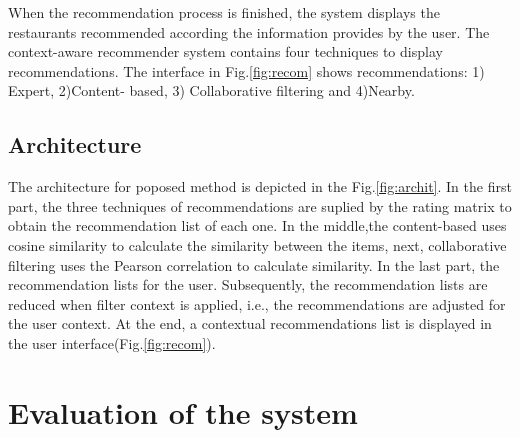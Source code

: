 \begin{figure*}
\captionsetup{justification=centering,margin=2cm}
\centering
{}
\caption{System interface to collect contextual information.}
\label{fig:context}     
\end{figure*}


When the recommendation process is finished, the system displays the restaurants
recommended according the information provides by the user. The context-aware
recommender system contains four techniques to display recommendations. The
interface in Fig.\ref{fig:recom} shows recommendations: 1) Expert, 2)Content-
based, 3) Collaborative filtering and 4)Nearby.

\begin{figure*}
\captionsetup{justification=centering,margin=2cm}
\centering
{}
\caption{System inferface of recommendations section.}
\label{fig:recom}       
\end{figure*}

\subsection{Architecture} \label{sec:3.5}

The architecture for poposed method is depicted in the Fig.\ref{fig:archit}. In
the first part, the three techniques of recommendations are suplied by the
rating matrix to obtain the recommendation list of each one.  In the middle,the
content-based uses cosine similarity to calculate the similarity between the
items, next, collaborative filtering uses the Pearson correlation to calculate
similarity.  In the last part, the recommendation lists for the user.
Subsequently, the recommendation lists are reduced when filter context is
applied, i.e., the recommendations are adjusted for the user context. At the
end, a contextual recommendations list is displayed in the user
interface(Fig.\ref{fig:recom}).

\begin{figure*}
\captionsetup{justification=centering,margin=2cm}
\centering
{}
\caption{Architecture proposed.}
\label{fig:archit}    
\end{figure*}

\section{Evaluation of the system} \label{sec:4}

